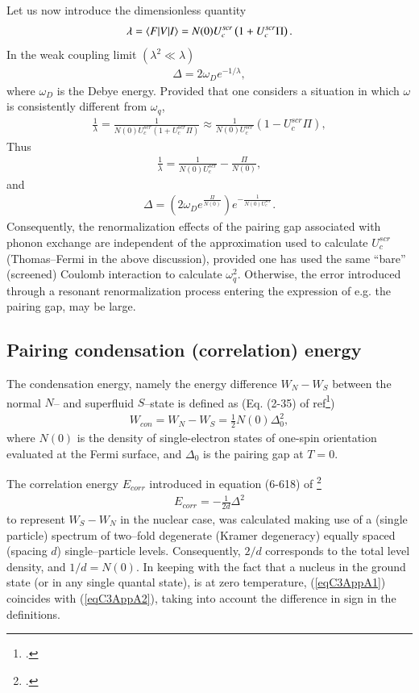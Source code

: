 Let us now introduce the dimensionless quantity
\begin{align}\label{eqC2AppA25}
\lambda=\langle {F|V|I} \rangle=N(0)U^{scr}_c\left(1+U^{scr}_c\Pi\right).
\end{align}
In the weak coupling limit $(\lambda^2\ll\lambda)$
\begin{align}\label{eqC2AppA26}
\Delta=2\omega_De^{-1/\lambda},
\end{align}
where $\omega_D$ is the Debye energy.
  Provided that one considers  a situation in which $\omega$ is consistently different from $\omega_q$,
\begin{align}\label{eqC2AppA28}
\frac{1}{\lambda}=\frac{1}{N(0)U^{scr}_c\left(1+U^{scr}_c\Pi\right)}\approx\frac{1}{N(0)U^{scr}_c}\left(1-U^{scr}_c\Pi\right),
\end{align}
Thus
\begin{align}\label{eqC2AppA29}
\frac{1}{\lambda}=\frac{1}{N(0)U^{scr}_c}-\frac{\Pi}{N(0)},
\end{align}
and
\begin{align}\label{eqC2AppA30}
\Delta=\left(2\omega_De^{\frac{\Pi}{N(0)}}\right)e^{-\frac{1}{N(0)U^{scr}_c}}.
\end{align}
Consequently, the renormalization effects of the pairing gap associated with phonon exchange are independent of the approximation used to calculate $U^{scr}_c$ (Thomas--Fermi in the above discussion), provided one has used the same ``bare'' (screened) Coulomb interaction to calculate $\omega^2_q$.   Otherwise, the error introduced through a resonant renormalization process entering the expression of e.g. the pairing gap, may be  large.
\subsection{Pairing condensation (correlation) energy}



The condensation energy, namely the energy difference $W_N-W_S$ between the normal $N$-- and superfluid $S$--state is defined as (Eq. (2-35) of ref\footnote{\label{foot1}\cite{Schrieffer:64}.})
\begin{align}\label{eqC3AppA1}
W_{con}=W_N-W_S=\frac{1}{2}N(0)\Delta_0^2,
\end{align}
where $N(0)$ is the density of single-electron states of one-spin orientation evaluated at the Fermi surface, and $\Delta_0$ is the pairing gap at $T=0$.


The correlation energy $E_{corr}$ introduced in equation (6-618) of \footnote{\cite{Bohr:75}.}
\begin{align}\label{eqC3AppA2}
E_{corr}=-\frac{1}{2d}\Delta^2
\end{align}
to represent $W_S-W_N$ in the nuclear case, was calculated making use of a (single particle) spectrum of two--fold degenerate (Kramer degeneracy) equally spaced (spacing $d$) single--particle levels. Consequently, $2/d$ corresponds to the total level density, and $1/d=N(0)$. In keeping with the fact that a nucleus in the ground state (or in any single quantal state), is at zero temperature, (\ref{eqC3AppA1})  coincides with (\ref{eqC3AppA2}), taking into account the difference in sign in the definitions.
